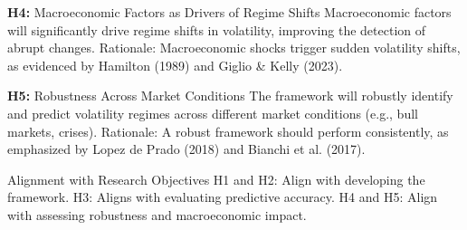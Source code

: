 \textbf{H4:} Macroeconomic Factors as Drivers of Regime Shifts
Macroeconomic factors will significantly drive regime shifts in volatility, improving the detection of abrupt changes.
Rationale: Macroeconomic shocks trigger sudden volatility shifts, as evidenced by Hamilton (1989) and Giglio \& Kelly (2023).

\textbf{H5:} Robustness Across Market Conditions
The framework will robustly identify and predict volatility regimes across different market conditions (e.g., bull markets, crises).
Rationale: A robust framework should perform consistently, as emphasized by Lopez de Prado (2018) \cite{lopez_de_prado_2018} and Bianchi et al. (2017).


Alignment with Research Objectives
H1 and H2: Align with developing the framework.
H3: Aligns with evaluating predictive accuracy.
H4 and H5: Align with assessing robustness and macroeconomic impact.
